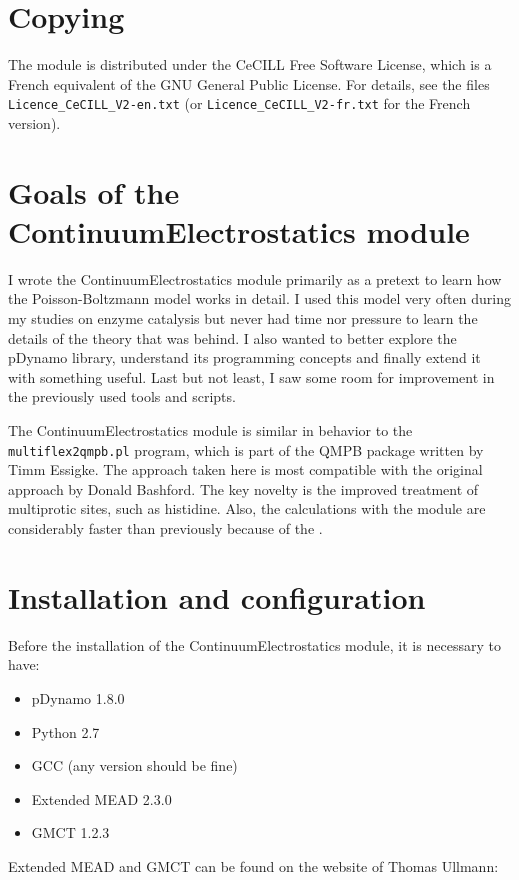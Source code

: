 \documentclass[a4paper,11pt]{article}
\newcommand{\modulename}{ContinuumElectrostatics\xspace}
\begin{document}
\section{Copying}
The module is distributed under the CeCILL Free Software License, which is
a French equivalent of the GNU General Public License.
%
For details, see the files \texttt{Licence\_CeCILL\_V2-en.txt} (or
\texttt{Licence\_CeCILL\_V2-fr.txt} for the French version).


\section{Goals of the \modulename module}
I wrote the \modulename module primarily as a pretext to learn how
the Poisson-Boltzmann model works in detail.
%
I used this model very often during my studies on enzyme catalysis but never had
time nor pressure to learn the details of the theory that was behind.
%
I also wanted to better explore the pDynamo library, understand its programming
concepts and finally extend it with something useful.
%
Last but not least, I saw some room for improvement in the previously used
tools and scripts.

The \modulename module is similar in behavior to the \texttt{multiflex2qmpb.pl}
program, which is part of the QMPB package written by Timm Essigke\cite{Essigke_PhD}.
%
The approach taken here is most compatible with the original approach
by Donald Bashford\cite{Bashford1992}.
%
The key novelty is the improved treatment of multiprotic sites, 
such as histidine.
%
Also, the calculations with the \makebox{\modulename} module are considerably faster 
than previously because of the .

%


\section{Installation and configuration}
Before the installation of the \modulename module, it is necessary
to have:
\begin{itemize}
  \setlength{\itemsep}{2pt}
  \item pDynamo 1.8.0
  \item Python 2.7
  \item GCC (any version should be fine)
  \item Extended MEAD 2.3.0
  \item GMCT 1.2.3
\end{itemize}
%
Extended MEAD and GMCT can be found on the website of Thomas Ullmann:
\end{document}
